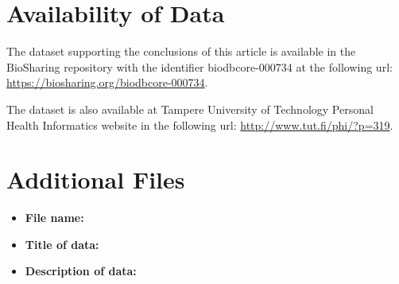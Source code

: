 \documentclass[twocolumn]{bmcart}%
\begin{document}
\section*{Availability of Data}
The dataset supporting the conclusions of this article is available in the BioSharing repository with the identifier biodbcore-000734 at the following url: \url{https://biosharing.org/biodbcore-000734}.

The dataset is also available at Tampere University of Technology Personal Health Informatics website in the following url: \url{http://www.tut.fi/phi/?p=319}.

\section*{Additional Files}

\begin{itemize}
\item \textbf{File name:}
\item \textbf{Title of data:}
\item \textbf{Description of data:}
\end{itemize}


\end{document}
